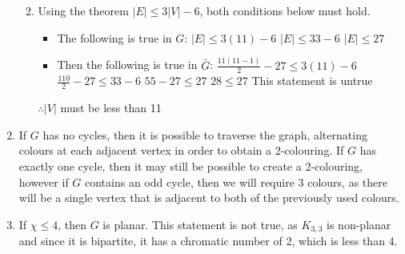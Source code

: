 \documentclass{article}
\begin{document}
\begin{enumerate}
\begin{enumerate}
			\newline
			\item Using the theorem $|E|\leq 3|V|-6$, both conditions below must hold.
			\begin{itemize}
				\item The following is true in $G$:
				\newline $|E|\leq3(11)-6$
				\newline $|E|\leq33-6$
				\newline $|E|\leq27$
				\newpage
				\item Then the following is true in $\bar{G}$:
				\newline $\frac{11(11-1)}{2}-27\leq3(11)-6$
				\newline $\frac{110}{2}-27\leq33-6$
				\newline $55-27\leq27$
				\newline $28\leq27$
				\newline This statement is untrue
			\end{itemize}
			$\therefore |V|$ must be less than 11
		\end{enumerate}
	
		\item If $G$ has no cycles, then it is possible to traverse the graph, alternating colours at each adjacent vertex in order to obtain a 2-colouring. If $G$ has exactly one cycle, then it may still be possible to create a 2-colouring, however if $G$ contains an odd cycle, then we will require 3 colours, as there will be a single vertex that is adjacent to both of the previously used colours.
		
		\item If $\chi\le4$, then $G$ is planar.
		\newline This statement is not true, as $K_{3,3}$ is non-planar and since it is bipartite, it has a chromatic number of 2, which is less than 4.
		

\end{enumerate}
\end{document}
